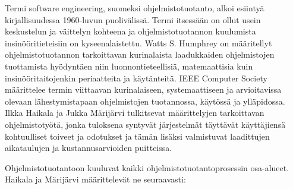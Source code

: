 \documentclass[finnish,12pt]{tktltiki2}
\theoremstyle{definition}
\theoremstyle{remark}
\begin{document}
Termi software engineering, suomeksi ohjelmistotuotanto, alkoi esiintyä kirjallisuudessa 1960-luvun puolivälissä. Termi itsessään on ollut usein keskustelun ja väittelyn kohteena ja ohjelmistotuotannon kuulumista insinööritieteisiin on kyseenalaistettu. \cite{DBLP:reference/se/Grier10,haikala2003ohjelmistotuotanto,mahoney04}
Watts S. Humphrey on määritellyt ohjelmistotuotannon tarkoittavan kurinalaista laadukkaiden ohjelmistojen tuottamista hyödyntäen niin luonnontieteellisiä, matemaattisia kuin insinööritaitojenkin periaatteita ja käytänteitä\cite{Humphrey:1988:SEP:75110.75122}. IEEE Computer Society määrittelee termin viittaavan kurinalaiseen, systemaattiseen ja arvioitavissa olevaan lähestymistapaan ohjelmistojen tuotannossa, käytössä ja ylläpidossa\cite{swebok}. Ilkka Haikala ja Jukka Märijärvi tulkitsevat määrittelyjen tarkoittavan ohjelmistotyötä, jonka tuloksena syntyvät järjestelmät täyttävät käyttäjiensä kohtuulliset toiveet ja odotukset ja tämän lisäksi valmistuvat laadittujen aikataulujen ja kustannusarvioiden puitteissa\cite{haikala2003ohjelmistotuotanto}.

Ohjelmistotuotantoon kuuluvat kaikki ohjelmistotuotantoprosessin osa-alueet. Haikala ja Märijärvi \cite{haikala2003ohjelmistotuotanto} määrittelevät ne seuraavasti:
\end{document}
